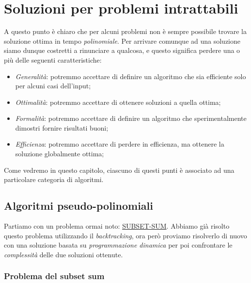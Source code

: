 \chapter{Soluzioni per problemi intrattabili}
A questo punto è chiaro che per alcuni problemi non è sempre possibile trovare
la soluzione ottima in tempo \emph{polinomiale}. Per arrivare comunque ad una
soluzione siamo dunque costretti a rinunciare a qualcosa, e questo significa
perdere una o più delle seguenti caratteristiche:
\begin{itemize}
    \item \emph{Generalità}: potremmo accettare di definire un algoritmo che
    sia efficiente solo per alcuni casi dell'input;
    \item \emph{Ottimalità}: potremmo accettare di ottenere soluzioni 
    a quella ottima;
    \item \emph{Formalità}: potremmo accettare di definire un algoritmo che
    sperimentalmente dimostri fornire risultati buoni;
    \item \emph{Efficienza}: potremmo accettare di perdere in efficienza, ma
    ottenere la soluzione globalmente ottima;
\end{itemize}
Come vedremo in questo capitolo, ciascuno di questi punti è associato ad una
particolare categoria di algoritmi.

\section{Algoritmi pseudo-polinomiali}
Partiamo con un problema ormai noto: \hyperref[prob:33]{SUBSET-SUM}.
Abbiamo già risolto questo problema utilizzando il \emph{backtracking}, ora
però proviamo risolverlo di nuovo con una soluzione basata su
\emph{programmazione dinamica} per poi confrontare le \emph{complessità} delle
due soluzioni ottenute.

\subsection{Problema del subset sum}
